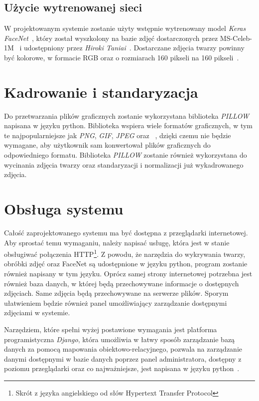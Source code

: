 \subsection{Użycie wytrenowanej sieci}

W projektowanym systemie zostanie użyty wstępnie wytrenowany model \textit{Keras FaceNet}~\cite{taniai-2018},
który został wyszkolony na bazie zdjęć dostarczonych przez MS-Celeb-1M~\cite{microsoft-2020-celeb1m}
i udostępniony przez \textit{Hiroki Taniai}~\cite{taniai-no-date}.
Dostarczane zdjęcia twarzy powinny być kolorowe, w formacie RGB oraz
o rozmiarach 160 pikseli na 160 pikseli~\cite{brownlee-2019}.


\section{Kadrowanie i standaryzacja}

Do przetwarzania plików graficznych zostanie wykorzystana biblioteka \textit{PILLOW} napisana w języku python.
Biblioteka wspiera wiele formatów graficznych,
w tym te najpopularniejsze jak \textit{PNG}, \textit{GIF}, \textit{JPEG} oraz ~\cite{pillow_doc},
dzięki czemu nie będzie wymagane, aby użytkownik sam konwertował plików graficznych do odpowiedniego formatu.
Biblioteka \textit{PILLOW} zostanie również wykorzystana do wycinania zdjęcia twarzy oraz standaryzacji
i normalizacji już wykadrowanego zdjęcia.


\section{Obsługa systemu}

Całość zaprojektowanego systemu ma być dostępna z przeglądarki internetowej.
Aby sprostać temu wymaganiu, należy napisać usługę, która jest w stanie obsługiwać połączenia
HTTP\footnote{Skrót z języka angielskiego od słów Hypertext Transfer Protocol}.
Z powodu, że narzędzia do wykrywania twarzy, obróbki zdjęć oraz FaceNet są udostępnione w języku python,
program zostanie również napisany w tym języku.
Oprócz samej strony internetowej potrzebna jest również baza danych,
w której będą przechowywane informacje o dostępnych zdjęciach.
Same zdjęcia będą przechowywane na serwerze plików.
Sporym ułatwieniem będzie również panel umożliwiający zarządzanie dostępnymi zdjęciami w systemie.

Narzędziem, które spełni wyżej postawione wymagania jest platforma programistyczna \textit{Django},
która umożliwia w łatwy sposób zarządzanie bazą danych za pomocą mapowania obiektowo-relacyjnego,
pozwala na zarządzanie danymi dostępnymi w bazie danych poprzez panel administratora, dostępny
z poziomu przeglądarki oraz co najważniejsze, jest napisana w języku python~\cite{djangodoc}.